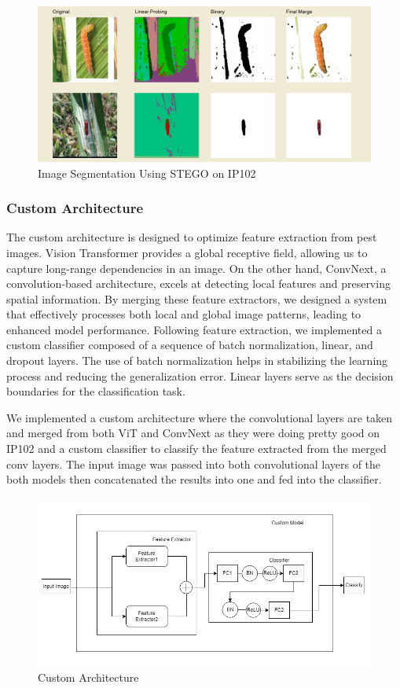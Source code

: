 \begin{figure}
    \centering
    \includegraphics[scale=.3]{figures/stego.png}
    \caption{Image Segmentation Using STEGO on IP102}
    \label{fig:stego}
\end{figure}
\subsubsection{Custom Architecture}
The custom architecture is designed to optimize feature extraction from pest images. Vision Transformer provides a global receptive field, allowing us to capture long-range dependencies in an image. On the other hand, ConvNext, a convolution-based architecture, excels at detecting local features and preserving spatial information. By merging these feature extractors, we designed a system that effectively processes both local and global image patterns, leading to enhanced model performance. Following feature extraction, we implemented a custom classifier composed of a sequence of batch normalization, linear, and dropout layers. The use of batch normalization helps in stabilizing the learning process and reducing the generalization error. Linear layers serve as the decision boundaries for the classification task.

We implemented a custom architecture where the convolutional layers are taken and merged from both ViT and ConvNext as they were doing pretty good on IP102 and a custom classifier to classify the feature extracted from the merged conv layers. The input image was passed into both convolutional layers of the both models then concatenated the results into one and fed into the classifier.
\begin{figure}
    \centering
    \includegraphics[scale=.5]{figures/custom.png}
    \caption{Custom Architecture}
    \label{fig:my_label}
\end{figure}


